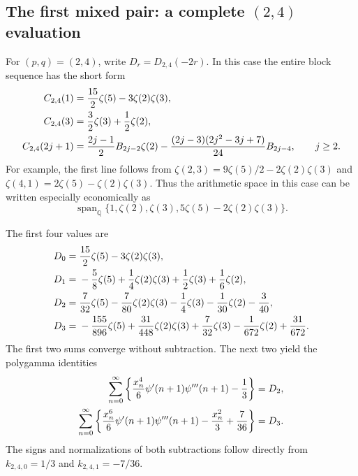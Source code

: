 \subsection{The first mixed pair: a complete \texorpdfstring{$(2,4)$}{(2,4)} evaluation}

For \((p,q)=(2,4)\), write \(D_r=D_{2,4}(-2r)\). In this case
the entire block sequence has the short form
\begin{align}\label{tail:24-blocks}
 C_{2,4}(1)&=\frac{15}{2}\zeta(5)-3\zeta(2)\zeta(3),\notag\\
 C_{2,4}(3)&=\frac32\zeta(3)+\frac12\zeta(2),\notag\\
 C_{2,4}(2j+1)&=\frac{2j-1}{2}B_{2j-2}\zeta(2)
  -\frac{(2j-3)(2j^2-3j+7)}{24}B_{2j-4},\qquad j\ge2.
\end{align}
For example, the first line follows from
\(\zeta(2,3)=9\zeta(5)/2-2\zeta(2)\zeta(3)\) and
\(\zeta(4,1)=2\zeta(5)-\zeta(2)\zeta(3)\). Thus the arithmetic
space in this case can be written especially economically as
\begin{equation}\label{tail:24-space}
 \operatorname{span}_{\mathbb Q}
 \{1,\zeta(2),\zeta(3),5\zeta(5)-2\zeta(2)\zeta(3)\}.
\end{equation}

The first four values are
\begin{align}\label{tail:24-values}
 D_0={}&\frac{15}{2}\zeta(5)-3\zeta(2)\zeta(3),\notag\\
 D_1={}&-\frac58\zeta(5)+\frac14\zeta(2)\zeta(3)
                    +\frac12\zeta(3)+\frac16\zeta(2),\notag\\
 D_2={}&\frac7{32}\zeta(5)-\frac7{80}\zeta(2)\zeta(3)
              -\frac14\zeta(3)-\frac1{30}\zeta(2)-\frac3{40},\notag\\
 D_3={}&-\frac{155}{896}\zeta(5)+\frac{31}{448}\zeta(2)\zeta(3)
              +\frac7{32}\zeta(3)-\frac1{672}\zeta(2)+\frac{31}{672}.
\end{align}
The first two sums converge without subtraction. The next two yield
the polygamma identities
\begin{align}\label{tail:24-polygamma-sums}
 \sum_{n=0}^{\infty}
 \left\{\frac{x_n^4}{6}\psi'(n+1)\psi'''(n+1)-\frac13\right\}
       &=D_2,\notag\\
 \sum_{n=0}^{\infty}
 \left\{\frac{x_n^6}{6}\psi'(n+1)\psi'''(n+1)
                   -\frac{x_n^2}{3}+\frac7{36}\right\}
       &=D_3.
\end{align}
The signs and normalizations of both subtractions follow directly
from \(k_{2,4,0}=1/3\) and \(k_{2,4,1}=-7/36\).

